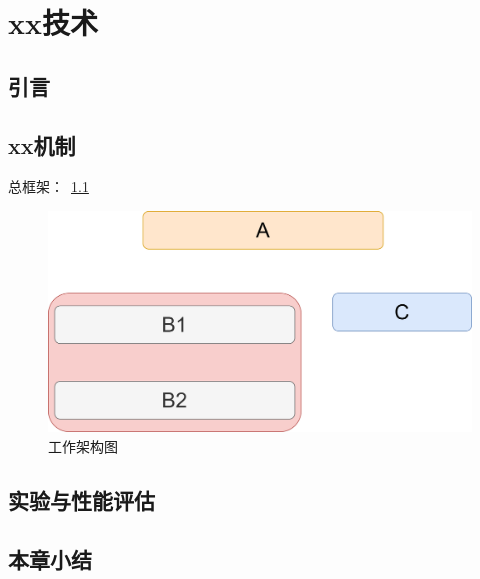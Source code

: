 \chapter{xx技术}
\label{chapter:work2}
\section{引言}
\section{xx机制}
总框架：~\ref{fig:arch}

\begin{figure}[!ht]
\centering
\includegraphics[width=\textwidth]{res/figs/arch.png}
\caption{工作架构图}
\label{fig:arch}
\end{figure}

\section{实验与性能评估}

\section{本章小结}

